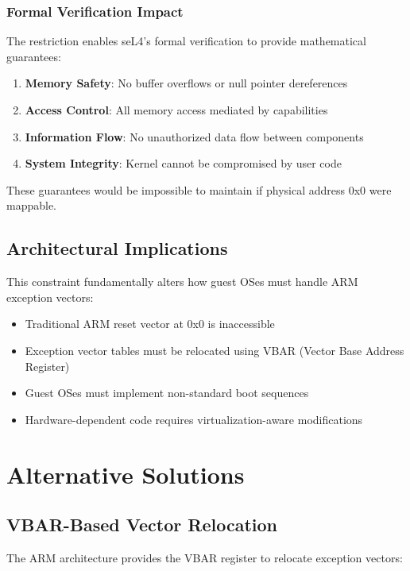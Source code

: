 \documentclass[11pt,a4paper]{article}
\begin{document}
\subsubsection{Formal Verification Impact}

The restriction enables seL4's formal verification to provide mathematical guarantees:

\begin{enumerate}
    \item \textbf{Memory Safety}: No buffer overflows or null pointer dereferences
    \item \textbf{Access Control}: All memory access mediated by capabilities
    \item \textbf{Information Flow}: No unauthorized data flow between components
    \item \textbf{System Integrity}: Kernel cannot be compromised by user code
\end{enumerate}

These guarantees would be impossible to maintain if physical address 0x0 were mappable.

\subsection{Architectural Implications}

This constraint fundamentally alters how guest OSes must handle ARM exception vectors:

\begin{itemize}
    \item Traditional ARM reset vector at 0x0 is inaccessible
    \item Exception vector tables must be relocated using VBAR (Vector Base Address Register)
    \item Guest OSes must implement non-standard boot sequences
    \item Hardware-dependent code requires virtualization-aware modifications
\end{itemize}

\section{Alternative Solutions}

\subsection{VBAR-Based Vector Relocation}

The ARM architecture provides the VBAR register to relocate exception vectors:
\end{document}
